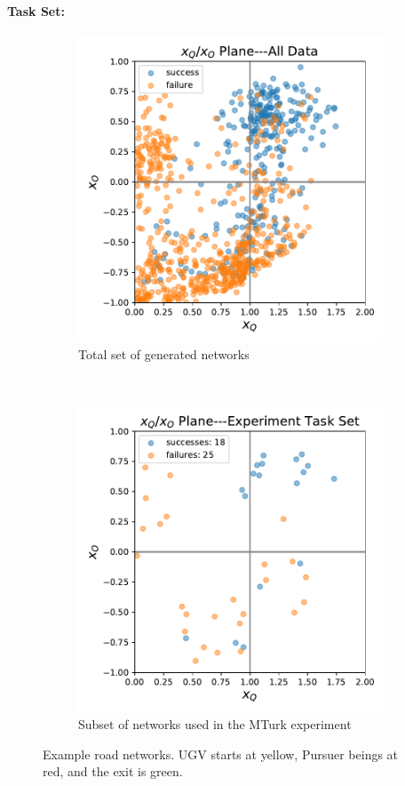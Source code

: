     \paragraph{Task Set:}

    \begin{figure}[tbp]
        \centering
        \begin{subfigure}[b]{0.80\linewidth}
            \centering
            \includegraphics[width=0.7\linewidth]{Figures/xQxO_Plane.pdf}
            \vfill
            \caption{Total set of generated networks}
            \label{fig:tot_set}
        \end{subfigure}%
        \\
        \begin{subfigure}[b]{0.80\linewidth}
            \centering
            \includegraphics[width=0.7\linewidth]{Figures/xQxO_plane_experiment_set.pdf}
            \caption{Subset of networks used in the MTurk experiment}
            \label{fig:exp_set}
        \end{subfigure} 
        \caption{Example road networks. UGV starts at yellow, Pursuer beings at red, and the exit is green.}
        \label{fig:experiment_data}
        \vspace{-0.2cm}
    \end{figure}
